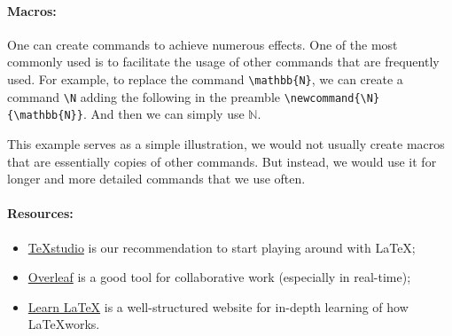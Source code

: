\documentclass[10pt]{article}
\newcommand{\N}{\mathbb{N}}
\begin{document}
\paragraph*{Macros:}
One can create commands to achieve numerous effects. One of the most commonly used is to facilitate the usage of other commands that are frequently used. For example, to replace the command \verb|\mathbb{N}|, we can create a command \verb|\N| adding the following in the preamble \verb|\newcommand{\N}{\mathbb{N}}|. And then we can simply use $\N$.

This example serves as a simple illustration, we would not usually create macros that are essentially copies of other commands.
But instead, we would use it for longer and more detailed commands that we use often.

\paragraph*{Resources:}
\begin{itemize}

    \item \href{https://www.texstudio.org/}{TeXstudio} is our recommendation to start playing around with \LaTeX;
    \item \href{https://www.overleaf.com/}{Overleaf} is a good tool for collaborative work (especially in real-time);
    \item \href{https://www.learnlatex.org/en/}{Learn \LaTeX} is a well-structured website for in-depth learning of how \LaTeX works.
\end{itemize}
\end{document}
